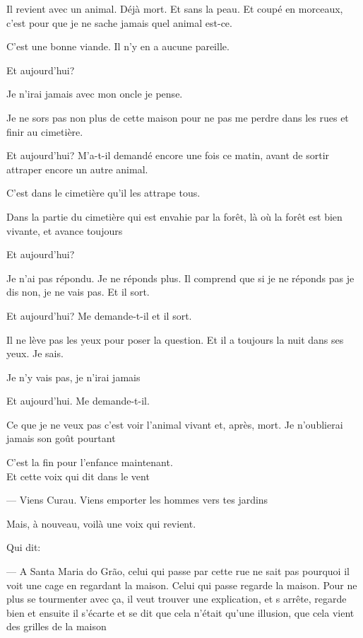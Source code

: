 Il revient avec un animal. Déjà mort. Et sans la peau. Et coupé en
morceaux, c'est pour que je ne sache jamais quel animal est-ce.

C'est une bonne viande. Il n'y en a aucune pareille.

Et aujourd'hui?

Je n'irai jamais avec mon oncle je pense.

Je ne sors pas non plus de cette maison pour ne pas me perdre dans les
rues et finir au cimetière.

Et aujourd'hui? M'a-t-il demandé encore une fois ce matin, avant de
sortir attraper encore un autre animal.

C'est dans le cimetière qu'il les attrape tous.

Dans la partie du cimetière qui est envahie par la forêt, là où la forêt
est bien vivante, et avance toujours

Et aujourd'hui?

Je n'ai pas répondu. Je ne réponds plus. Il comprend que si je ne
réponds pas je dis non, je ne vais pas. Et il sort.

Et aujourd'hui? Me demande-t-il et il sort.

Il ne lève pas les yeux pour poser la question. Et il a toujours la nuit
dans ses yeux. Je sais.

Je n'y vais pas, je n'irai jamais

Et aujourd'hui. Me demande-t-il.

Ce que je ne veux pas c'est voir l'animal vivant et, après, mort. Je
n'oublierai jamais son goût pourtant

\pagebreak

\vspace*{4cm}

C'est la fin pour l'enfance maintenant.\\

Et cette voix qui dit dans le vent

--- Viens Curau. Viens emporter les hommes vers tes jardins

\pagebreak

\vspace*{4cm}

Mais, à nouveau, voilà une voix qui revient.

Qui dit:

--- A Santa Maria do Grão, celui qui passe par cette rue ne sait pas
  pourquoi il voit une cage en regardant la maison. Celui qui passe
  regarde la maison. Pour ne plus se tourmenter avec ça, il veut trouver
  une explication, et s arrête, regarde bien et ensuite il s'écarte et
  se dit que cela n'était qu'une illusion, que cela vient des grilles de
  la maison

